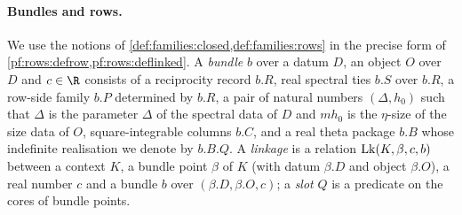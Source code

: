 \paragraph{Bundles and rows.}
We use the notions of \cref{def:families:closed,def:families:rows} in the precise form of
\cref{pf:rows:defrow,pf:rows:deflinked}. A \emph{bundle} $b$ over a datum $D$, an object $O$ over $D$ and $c\in\R$
consists of a reciprocity record $b.R$, real spectral ties $b.S$ over $b.R$, a row-side family $b.P$ determined by
$b.R$, a pair of natural numbers $(\Delta,h_0)$ such that $\Delta$ is the parameter $\Delta$ of the spectral data of $D$ and
$mh_0$ is the $\eta$-size of the size data of $O$, square-integrable columns
$b.C$, and a real theta package $b.B$ whose indefinite realisation we denote by $b.B.Q$. A \emph{linkage} is a relation
$\mathrm{Lk}(K,\beta,c,b)$ between a context $K$, a bundle point $\beta$ of $K$ (with datum $\beta.D$ and object
$\beta.O$), a real number $c$ and a bundle $b$ over $(\beta.D,\beta.O,c)$; a \emph{slot} $Q$ is a predicate on the cores
of bundle points.

